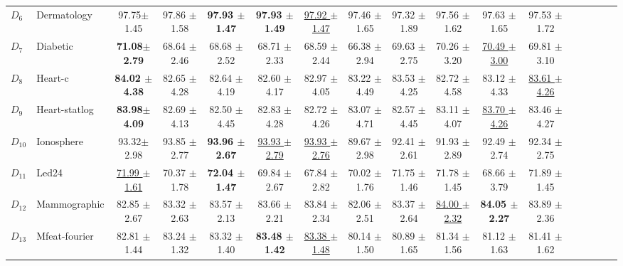 {\begin{landscape}
\begin{table}[!ht]
\begin{adjustbox}{max width=1.5\textwidth}
\begin{tabular}{llccccccccccccccc}
  $D_6$ & Dermatology &  97.75$\pm$ 1.45  & 97.86 $\pm$ 1.58  & \textbf{97.93 $\pm$ 1.47}  & \textbf{97.93 $\pm$  1.49}	 & \underline{97.92 $\pm$ 1.47}
  &  97.46 $\pm$ 1.65 & 97.32 $\pm$ 1.89 & 97.56 $\pm$ 1.62 & 97.63 $\pm$ 1.65  & 97.53 $\pm$ 1.72 \\ 
  
  $D_7$ & Diabetic &  \textbf{71.08$\pm$ 2.79}  & 68.64 $\pm$ 2.46  & 68.68 $\pm$ 2.52  & 68.71 $\pm$  2.33  & 68.59 $\pm$ 2.44  &  66.38 $\pm$ 2.94 & 69.63 $\pm$ 2.75  & 70.26 $\pm$ 3.20 &\underline{70.49 $\pm$ 3.00}& 69.81 $\pm$ 3.10 \\ 
  
  $D_8$ & Heart-c &  \textbf{84.02 $\pm$ 4.38} & 82.65 $\pm$ 4.28 & 82.64 $\pm$ 4.19  & 82.60 $\pm$ 4.17  & 82.97 $\pm$ 4.05 &  83.22 $\pm$ 4.49 & 83.53 $\pm$ 4.25 & 82.72 $\pm$ 4.58 & 83.12 $\pm$ 4.33 & \underline{83.61 $\pm$ 4.26}\\ 
  
  $D_9$ & Heart-statlog &  \textbf{83.98$\pm$ 4.09} & 82.69 $\pm$ 4.13 & 82.50 $\pm$ 4.45 & 82.83 $\pm$ 4.28  & 82.72 $\pm$ 4.26 & 83.07 $\pm$ 4.71 & 82.57 $\pm$ 4.45 & 83.11 $\pm$ 4.07 &\underline{83.70 $\pm$ 4.26}&  83.46 $\pm$ 4.27 \\ 
  
  $D_{10}$ & Ionosphere &  93.32$\pm$ 2.98  & 93.85 $\pm$ 2.77 &  \textbf{93.96 $\pm$ 2.67}  & \underline{93.93 $\pm$ 2.79}   & \underline{93.93 $\pm$ 2.76} & 89.67 $\pm$ 2.98 & 92.41 $\pm$ 2.61  & 91.93 $\pm$ 2.89 &92.49 $\pm$ 2.74&  92.34 $\pm$ 2.75 \\ 
  
  $D_{11}$ & Led24 &  \underline{71.99 $\pm$ 1.61}  & 70.37 $\pm$ 1.78  & \textbf{72.04 $\pm$ 1.47} & 69.84 $\pm$ 2.67  & 67.84 $\pm$ 2.82 &  70.02 $\pm$ 1.76 & 71.75 $\pm$ 1.46 & 71.78 $\pm$ 1.45 & 68.66 $\pm$ 3.79&  71.89 $\pm$ 1.45 \\ 
  
  $D_{12}$ & Mammographic &  82.85 $\pm$ 2.67  & 83.32 $\pm$ 2.63	  & 83.57 $\pm$ 2.13	 & 83.66 $\pm$ 2.21	& 83.84 $\pm$ 2.34
 & 82.06 $\pm$ 2.51 & 83.37 $\pm$ 2.64 & \underline{84.00 $\pm$ 2.32} &\textbf{84.05 $\pm$ 2.27}& 83.89 $\pm$ 2.36 \\ 
  
  $D_{13}$ & Mfeat-fourier &  82.81 $\pm$ 1.44  & 83.24 $\pm$ 1.32  & 83.32 $\pm$ 1.40 & \textbf{83.48 $\pm$ 1.42}  & \underline{83.38 $\pm$ 1.48}  & 80.14 $\pm$ 1.50 & 80.89 $\pm$ 1.65 & 81.34 $\pm$ 1.56 &81.12 $\pm$ 1.63 &  81.41 $\pm$ 1.62 \\ 
  

\end{tabular}
\end{adjustbox}
\end{table}
\end{landscape}}
